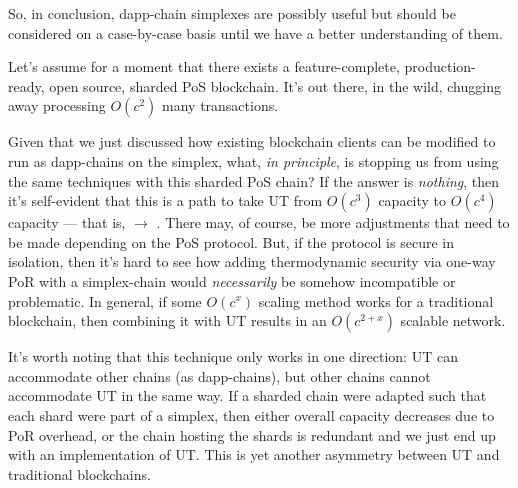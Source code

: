 So, in conclusion, dapp-chain simplexes are possibly useful but should be considered on a case-by-case basis until we have a better understanding of them.


Let's assume for a moment that there exists a feature-complete, production-ready, open source, sharded PoS blockchain.
It's out there, in the wild, chugging away processing $O(c^2)$ many transactions.

Given that we just discussed how existing blockchain clients can be modified to run as dapp-chains on the simplex, what, \emph{in principle}, is stopping us from using the same techniques with this sharded PoS chain?
If the answer is \emph{nothing}, then it's self-evident that this is a path to take UT from $O(c^3)$ capacity to $O(c^4)$ capacity --- that is,  $\to$ .
There may, of course, be more adjustments that need to be made depending on the PoS protocol.
But, if the protocol is secure in isolation, then it's hard to see how adding thermodynamic security via one-way PoR with a simplex-chain would \emph{necessarily} be somehow incompatible or problematic.
In general, if some $O(c^x)$ scaling method works for a traditional blockchain, then combining it with UT results in an $O(c^{2+x})$ scalable network.

It's worth noting that this technique only works in one direction: UT can accommodate other chains (as dapp-chains), but other chains cannot accommodate UT in the same way.
If a sharded chain were adapted such that each shard were part of a simplex, then either overall capacity decreases due to PoR overhead, or the chain hosting the shards is redundant and we just end up with an implementation of UT.
This is yet another asymmetry between UT and traditional blockchains.
